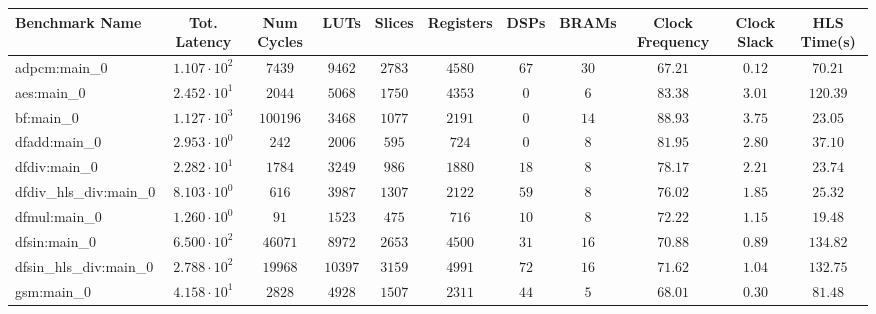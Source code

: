 \begin{tabular}{|l|c|c|c|c|c|c|c|c|c|c|}
\hline
Benchmark Name          & Tot. Latency           & Num Cycles & LUTs      & Slices    & Registers & DSPs    & BRAMs   & Clock Frequency & Clock Slack & HLS Time(s) \\
\hline
adpcm:main\_0           & $ 1.107 \cdot 10^{2} $ & $ 7439   $ & $ 9462  $ & $ 2783  $ & $ 4580  $ & $ 67  $ & $ 30  $ & $ 67.21       $ & $ 0.12    $ & $ 70.21   $ \\
aes:main\_0             & $ 2.452 \cdot 10^{1} $ & $ 2044   $ & $ 5068  $ & $ 1750  $ & $ 4353  $ & $ 0   $ & $ 6   $ & $ 83.38       $ & $ 3.01    $ & $ 120.39  $ \\
bf:main\_0              & $ 1.127 \cdot 10^{3} $ & $ 100196 $ & $ 3468  $ & $ 1077  $ & $ 2191  $ & $ 0   $ & $ 14  $ & $ 88.93       $ & $ 3.75    $ & $ 23.05   $ \\
dfadd:main\_0           & $ 2.953 \cdot 10^{0} $ & $ 242    $ & $ 2006  $ & $ 595   $ & $ 724   $ & $ 0   $ & $ 8   $ & $ 81.95       $ & $ 2.80    $ & $ 37.10   $ \\
dfdiv:main\_0           & $ 2.282 \cdot 10^{1} $ & $ 1784   $ & $ 3249  $ & $ 986   $ & $ 1880  $ & $ 18  $ & $ 8   $ & $ 78.17       $ & $ 2.21    $ & $ 23.74   $ \\
dfdiv\_hls\_div:main\_0 & $ 8.103 \cdot 10^{0} $ & $ 616    $ & $ 3987  $ & $ 1307  $ & $ 2122  $ & $ 59  $ & $ 8   $ & $ 76.02       $ & $ 1.85    $ & $ 25.32   $ \\
dfmul:main\_0           & $ 1.260 \cdot 10^{0} $ & $ 91     $ & $ 1523  $ & $ 475   $ & $ 716   $ & $ 10  $ & $ 8   $ & $ 72.22       $ & $ 1.15    $ & $ 19.48   $ \\
dfsin:main\_0           & $ 6.500 \cdot 10^{2} $ & $ 46071  $ & $ 8972  $ & $ 2653  $ & $ 4500  $ & $ 31  $ & $ 16  $ & $ 70.88       $ & $ 0.89    $ & $ 134.82  $ \\
dfsin\_hls\_div:main\_0 & $ 2.788 \cdot 10^{2} $ & $ 19968  $ & $ 10397 $ & $ 3159  $ & $ 4991  $ & $ 72  $ & $ 16  $ & $ 71.62       $ & $ 1.04    $ & $ 132.75  $ \\
gsm:main\_0             & $ 4.158 \cdot 10^{1} $ & $ 2828   $ & $ 4928  $ & $ 1507  $ & $ 2311  $ & $ 44  $ & $ 5   $ & $ 68.01       $ & $ 0.30    $ & $ 81.48   $ \\

\end{tabular}
